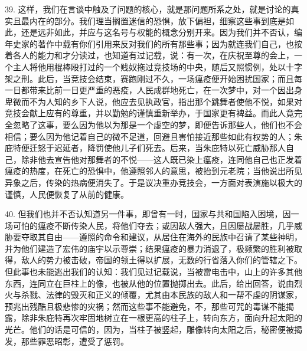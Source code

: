 39. 这样，我们在言谈中触及了问题的核心，就是那问题所系之处，就是讨论的真实且最内在的部分。我们理当搁置迷信的恐惧，放下偏袒，细察这些事到底是如此，还是远非如此，并应与这名号与权能的概念分别开来。因为我们并不否认，编年史家的著作中载有你们引用来反对我们的所有那些事；因为就连我们自己，也按着各人的能力和才分读过，也知道有过记载，说：有一次，在庆祝至尊的会上，一个主人将他用棍棒殴打过的一个贱奴拖过竞技场的中央，随后又照惯例，处以十字架之刑。此后，当竞技会结束，赛跑刚过不久，一场瘟疫便开始困扰国家；而且每一日都带来比前一日更严重的恶疫，人民成群地死亡，在一次梦中，对一个因出身卑微而不为人知的乡下人说，他应去见执政官，指出那个跳舞者使他不悦，如果对竞技会献上应有的尊重，并以勤勉的谨慎重新举办，于国家更有裨益。而此人竟完全忽略了这事，要么因为他以为那是一个虚空的梦，即便告诉那些人，他们也不会相信；要么因为他记着自己的微不足道，回避且害怕接近那些如此有权势的人；朱庇特便迁怒于迟延者，降罚使他儿子们死去。后来，当朱庇特以死亡威胁那人自己，除非他去宣告他对那舞者的不悦——这人既已染上瘟疫，连同他自己也正发着瘟疫的热度，在死亡的恐惧中，他遵照邻人的意思，被抬到元老院；当他说出所见异象之后，传染的热病便消失了。于是议决重办竞技会，一方面对表演施以极大的谨慎，人民便恢复了从前的健康。\par

40. 但我们也并不否认知道另一件事，即曾有一时，国家与共和国陷入困境，因一场可怕的瘟疫不断传染人民，将他们夺去；或因敌人强大，且因屡战屡胜，几乎威胁要夺取其自由——遵照的命令和建议，从居住在海外的民族中召请了某些神明，并为他们建造了宏伟的庙宇以示尊崇；结果瘟疫的暴力消退了，极频繁的胜利被取得，敌人的势力被击破，帝国的领土得以扩展，无数的行省落入你们的管辖之下。但此事也未能逃出我们的认知：我们见过记载说，当被雷电击中，山上的许多其他东西，连同立在巨柱上的像，也被从他的位置抛掷出去。此后，给出回答，说由烈火与杀戮、法律的毁灭和正义的倾覆，尤其由本民族的敌人和一帮不虔的阴谋家，预兆出残酷且极悲惨的灾祸；然而这些事不能避免，不，那些可咒的毒谋不能揭露，除非朱庇特再次牢固地树立在一根更高的柱子上，转向东方，面向升起太阳的光芒。他们的话是可信的，因为，当柱子被竖起，雕像转向太阳之后，秘密便被揭发，那些罪恶昭彰，遭受了惩罚。\par

